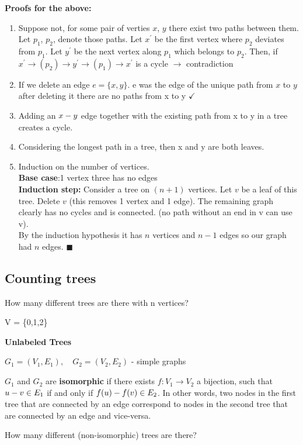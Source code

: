 \documentclass[9pt, letterpaper, oneside]{article}
\begin{document}
\textbf{Proofs for the above:}
\begin{enumerate}
    \item Suppose not, for some pair of verties $x$, $y$ there exist two paths between them. Let $p_1$, $p_2$, denote those paths. Let $x^{'}$ be the first vertex where $p_2$ deviates from $p_1$. Let $y^{'}$ be the next vertex along $p_1$ which belongs to $p_2$. 
    Then, if $x^{'} \to(p_2)\to y^{'} \to(p_1) \to x^{'}$ is a cycle $\to$ contradiction
    \item If we delete an edge $e = \{x, y\}$. e was the edge of the unique path from $x$ to $y$ after deleting it there are no paths from x to y $\checkmark$ 
    \item Adding an $x\-- y$ edge together with the existing path from x to y in a tree creates a cycle.
    \item Considering the longest path in a tree, then x and y are both leaves.
    \item Induction on the number of vertices.\\
    \textbf{Base case}:1 vertex three has no edges\\
    \textbf{Induction step:} Consider a tree on $(n+1)$ vertices. Let $v$ be a leaf of this tree. Delete $v$ (this removes 1 vertex and 1 edge). The remaining graph clearly has no cycles and is connected. (no path without an end in v can use v).\\
    By the induction hypothesis it has $n$ vertices and $n-1$ edges so our graph had $n$ edges. $\blacksquare$
\end{enumerate}

\subsection{Counting trees}
How many different trees are there with n vertices?

V = \{0,1,2\}

\textbf{Unlabeled Trees}

$G_1 = (V_1, E_1), \quad G_2 = (V_2, E_2)$ - simple graphs

$G_1$ and $G_2$ are \textbf{isomorphic} if there exists $f:V_1 \to V_2$ a bijection, such that $u \-- v \in E_1$ if and only if $f(u)\-- f(v) \in E_2$. In other words, two nodes in the first tree that are connected by an edge correspond to nodes in the second tree that are connected by an edge and vice-versa.

How many different (non-isomorphic) trees are there?
\end{document}
